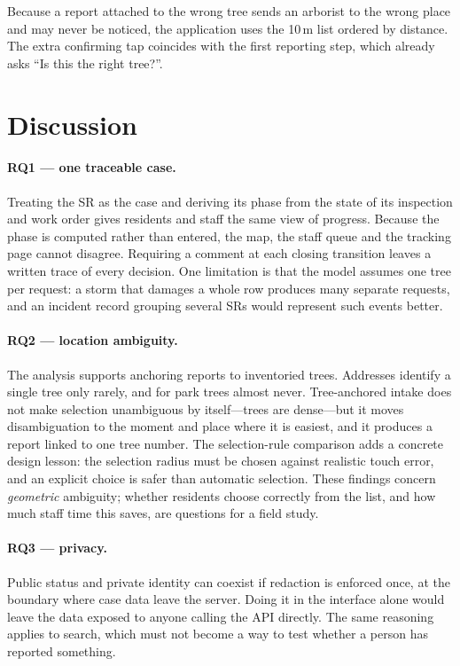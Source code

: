\documentclass[11pt,a4paper]{article}
\begin{document}
Because a report attached to the wrong tree sends an arborist to the wrong place and may never be noticed, the application uses the 10\,m list ordered by distance. The extra confirming tap coincides with the first reporting step, which already asks ``Is this the right tree?''.

\section{Discussion}
\label{sec:discussion}

\paragraph{RQ1 — one traceable case.}
Treating the SR as the case and deriving its phase from the state of its inspection and work order gives residents and staff the same view of progress. Because the phase is computed rather than entered, the map, the staff queue and the tracking page cannot disagree. Requiring a comment at each closing transition leaves a written trace of every decision. One limitation is that the model assumes one tree per request: a storm that damages a whole row produces many separate requests, and an incident record grouping several SRs would represent such events better.

\paragraph{RQ2 — location ambiguity.}
The analysis supports anchoring reports to inventoried trees. Addresses identify a single tree only rarely, and for park trees almost never. Tree-anchored intake does not make selection unambiguous by itself---trees are dense---but it moves disambiguation to the moment and place where it is easiest, and it produces a report linked to one tree number. The selection-rule comparison adds a concrete design lesson: the selection radius must be chosen against realistic touch error, and an explicit choice is safer than automatic selection. These findings concern \emph{geometric} ambiguity; whether residents choose correctly from the list, and how much staff time this saves, are questions for a field study.

\paragraph{RQ3 — privacy.}
Public status and private identity can coexist if redaction is enforced once, at the boundary where case data leave the server. Doing it in the interface alone would leave the data exposed to anyone calling the API directly. The same reasoning applies to search, which must not become a way to test whether a person has reported something.
\end{document}
